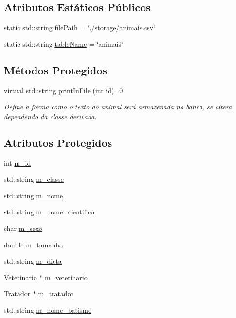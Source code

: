 \subsection*{Atributos Estáticos Públicos}
\begin{DoxyCompactItemize}
\item 
static std\+::string \hyperlink{classAnimal_a1e487e8b5e047f764f192a423e4d21ae}{file\+Path} = \char`\"{}./storage/animais.\+csv\char`\"{}
\item 
static std\+::string \hyperlink{classAnimal_a09d2d66762ed1fea5c6858d092b6ccb9}{table\+Name} = \char`\"{}animais\char`\"{}
\end{DoxyCompactItemize}
\subsection*{Métodos Protegidos}
\begin{DoxyCompactItemize}
\item 
virtual std\+::string \hyperlink{classAnimal_ac75406040726a6339932d70164cc7242}{print\+In\+File} (int id)=0
\begin{DoxyCompactList}\small\item\em Define a forma como o texto do animal será armazenada no banco, se altera dependendo da classe derivada. \end{DoxyCompactList}\end{DoxyCompactItemize}
\subsection*{Atributos Protegidos}
\begin{DoxyCompactItemize}
\item 
int \hyperlink{classAnimal_a1a39448480e098fc74b5b67c4921a5ec}{m\+\_\+id}
\item 
std\+::string \hyperlink{classAnimal_a8a4d049b481ab0fe88015cde7557d281}{m\+\_\+classe}
\item 
std\+::string \hyperlink{classAnimal_adea60068908c590e8f92b2680023f8ce}{m\+\_\+nome}
\item 
std\+::string \hyperlink{classAnimal_af90a04b32166b6815617cfd4033da1e4}{m\+\_\+nome\+\_\+cientifico}
\item 
char \hyperlink{classAnimal_aaa6d77e661ed0fa9a33500588c8acfef}{m\+\_\+sexo}
\item 
double \hyperlink{classAnimal_afe83ba40e79b42d06b0c95f61aaa0218}{m\+\_\+tamanho}
\item 
std\+::string \hyperlink{classAnimal_af7ea074464d9a468f7412a2165afd553}{m\+\_\+dieta}
\item 
\hyperlink{classVeterinario}{Veterinario} $\ast$ \hyperlink{classAnimal_a3b95df9484483642a10cafcafc15961d}{m\+\_\+veterinario}
\item 
\hyperlink{classTratador}{Tratador} $\ast$ \hyperlink{classAnimal_a1d9b76d126f6d72374f94d4d359e0ea7}{m\+\_\+tratador}
\item 
std\+::string \hyperlink{classAnimal_aa9717b7e2de07af7118050ca1c10d0b5}{m\+\_\+nome\+\_\+batismo}
\end{DoxyCompactItemize}


